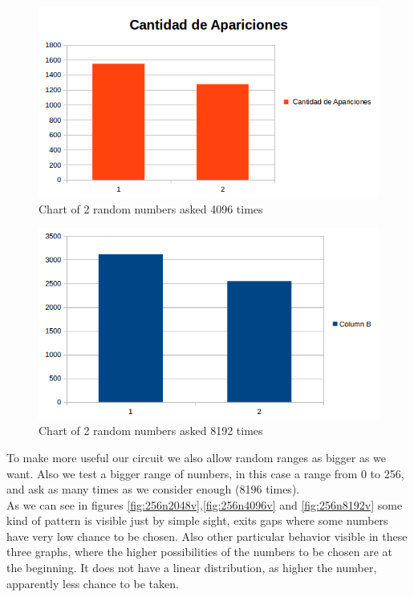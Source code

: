 \documentclass[twocolumn]{IEEEtran}
\begin{document}
\begin{enumerate}
    \begin{figure}[h!]
    \centering
    \includegraphics[width=\columnwidth]{src/2n4096v.png}
	\caption{Chart of 2 random numbers asked 4096 times}
    \label{fig:2n4096v}
    \end{figure}
    
    \begin{figure}[h!]
    \centering
    \includegraphics[width=\columnwidth]{src/2n8192v.png}
	\caption{Chart of 2 random numbers asked 8192 times}
    \label{fig:2n8192v}
    \end{figure}
    
To make more useful our circuit we also allow random ranges as bigger as we want. Also we test a bigger range of numbers, in  this case a range from 0 to 256, and ask as many times as we consider enough (8196 times). \\
As we can see in figures \ref{fig:256n2048v},\ref{fig:256n4096v} and \ref{fig:256n8192v} some kind of pattern is visible just by simple sight, exits gaps where some numbers have very low chance to be chosen. Also other particular behavior visible in these three graphs, where the higher possibilities of the numbers to be chosen are at the beginning. It does not have a linear distribution, as higher the number, apparently less chance to be taken.  


\end{enumerate}
\end{document}
